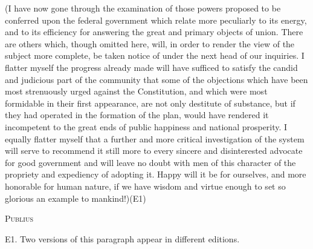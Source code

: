 (I have now gone through the examination of those powers proposed to be conferred upon the federal government which relate more peculiarly to its energy, and to its efficiency for answering the great and primary objects of union. There are others which, though omitted here, will, in order to render the view of the subject more complete, be taken notice of under the next head of our inquiries. I flatter myself the progress already made will have sufficed to satisfy the candid and judicious part of the community that some of the objections which have been most strenuously urged against the Constitution, and which were most formidable in their first appearance, are not only destitute of substance, but if they had operated in the formation of the plan, would have rendered it incompetent to the great ends of public happiness and national prosperity. I equally flatter myself that a further and more critical investigation of the system will serve to recommend it still more to every sincere and disinterested advocate for good government and will leave no doubt with men of this character of the propriety and expediency of adopting it. Happy will it be for ourselves, and more honorable for human nature, if we have wisdom and virtue enough to set so glorious an example to mankind!)(E1)

\vspace{.5cm}
\textsc{Publius}

\vspace{1.5cm}

E1. Two versions of this paragraph appear in different editions.

